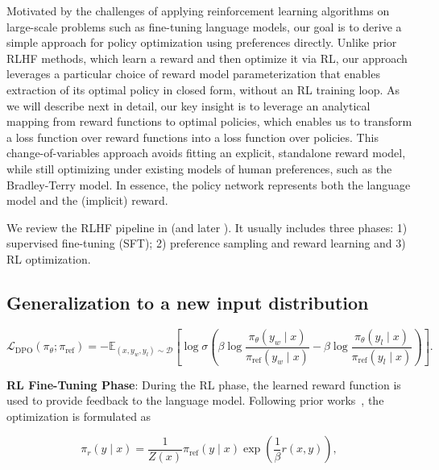 Motivated by the challenges of applying reinforcement learning algorithms on large-scale problems such as fine-tuning language models, our goal is to derive a simple approach for policy optimization using preferences directly. Unlike prior RLHF methods, which learn a reward and then optimize it via RL, our approach leverages a particular choice of reward model parameterization that enables extraction of its optimal policy in closed form, without an RL training loop. As we will describe next in detail, our key insight is to leverage an analytical mapping from reward functions to optimal policies, which enables us to transform a loss function over reward functions into a loss function over policies. This change-of-variables approach avoids fitting an explicit, standalone reward model, while still optimizing under existing models of human preferences, such as the Bradley-Terry model. In essence, the policy network represents both the language model and the (implicit) reward.

We review the RLHF pipeline in \citeauthor{ziegler2020finetuning} (and later \citep{stiennon2022learning, bai2022training, ouyang2022training}). It usually includes three phases: 1) supervised fine-tuning (SFT); 2) preference sampling and reward learning and 3) RL optimization.

\subsection{Generalization to a new input distribution}

\begin{equation}\label{eq:optimum_model}
    \mathcal{L}_\text{DPO}(\pi_{\theta}; \pi_\text{ref}) = -\mathbb{E}_{(x, y_w, y_l)\sim \mathcal{D}}\left[\log \sigma \left(\beta \log \frac{\pi_{\theta}(y_w\mid x)}{\pi_\text{ref}(y_w\mid x)} - \beta \log \frac{\pi_{\theta}(y_l\mid x)}{\pi_\text{ref}(y_l\mid x)}\right)\right].
\end{equation}

\textbf{RL Fine-Tuning Phase}: During the RL phase, the learned reward function is used to provide feedback to the language model. Following prior works~\citep{jaques2017sequence, jaques2020human}, the optimization is formulated as

\begin{equation}\label{eq:op_policy}
    \pi_r(y\mid x) = \frac{1}{Z(x)}\pi_\text{ref}(y\mid x)\exp\left(\frac{1}{\beta}r(x, y)\right),
\end{equation}

